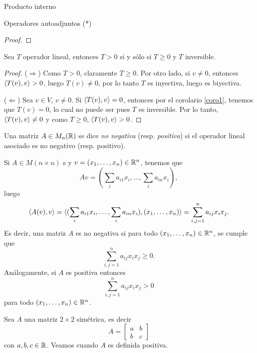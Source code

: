 \begin{chapter}{Producto interno}
\begin{section}{Operadores autoadjuntos (*)}
\begin{proof}
        
        \end{proof}
        
        
        \begin{corolario}
            Sea $T$ operador lineal, entonces $T > 0$ si y sólo si $T \ge 0$ y $T$ inversible. 
        \end{corolario}
        \begin{proof}
            ($\Rightarrow$) Como $T>0$, claramente $T \ge 0$. Por otro lado, si $v \ne 0$, entonces $\langle T(v), v \rangle > 0$, luego $T(v) \ne 0$, por lo tanto $T$ es inyectiva, luego es biyectiva.

            ($\Leftarrow$)  Sea $v \in V$, $v\not=0$. Si $\langle T(v), v \rangle = 0$,  entonces por el corolario \ref{coro1}, tenemos que $T(v)=0$, lo cual no puede ser pues $T$ es inversible. Por lo tanto, $\langle T(v), v \rangle \ne 0$ y como  $T\ge 0$, $\langle T(v), v \rangle > 0$.
        \end{proof}
        
        
        
        \begin{definicion}
            Una matriz $A \in  M_{n}(\mathbb R)$ se dice \textit{no negativa} (resp. \textit{positiva}) si el operador lineal asociado es no negativo (resp. positivo).  
        \end{definicion}
        
        Si  $A \in M(n \times n)$ s y $v=(x_1,\ldots,x_n) \in \mathbb R^n$, tenemos que 
        $$
        Av = (\sum_i a_{i1}x_i,\ldots, \sum_i a_{in}x_i),
        $$
        luego 
        $$
        \langle A(v), v\rangle = \langle  (\sum_i a_{i1}x_i,\ldots, \sum_i a_{in}x_i),(x_1,\ldots,x_n)\rangle =  \sum_{i,j=1}^n a_{ij}x_ix_j.
        $$
        Es  decir, una matriz $A$ es no negativa si para todo $(x_1,\ldots,x_n) \in \mathbb R^n$, se cumple que
        $$
         \sum_{i,j=1}^n a_{ij}x_ix_j \ge 0.
        $$
        Análogamente, si $A$ es positiva entonces 
        $$
         \sum_{i,j=1}^n a_{ij}x_ix_j > 0
        $$
        para todo $(x_1,\ldots,x_n) \in \mathbb R^n$.
        
        
        \begin{ejemplo*} Sea $A$ una matriz $2\times 2$ simétrica,  es decir
            $$
            A = \begin{bmatrix} 
            a&b\\b&c
            \end{bmatrix}
            $$
            con $a,b,c \in \mathbb R$. Veamos cuando $A$ es definida positiva.
            

\end{ejemplo*}
\end{section}
\end{chapter}
